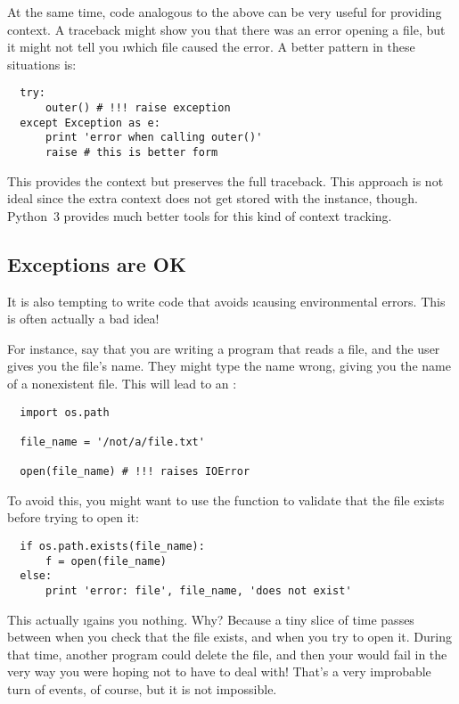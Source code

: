 \documentclass[letterpaper, 12pt, titlepage, twoside]{article}
\begin{document}
At the same time, code analogous to the above can be very useful for providing
context. A traceback might show you that there was an error opening a file,
but it might not tell you \i{which} file caused the error. A better pattern in
these situations is:

\begin{lstlisting}
  try:
      outer() # !!! raise exception
  except Exception as e:
      print 'error when calling outer()'
      raise # this is better form
\end{lstlisting}

This provides the context but preserves the full traceback. This approach is
not ideal since the extra context does not get stored with the 
instance, though. Python~3 provides much better tools for this kind of context
tracking.

\subsection*{Exceptions are OK}

It is also tempting to write code that avoids \i{causing} environmental
errors. This is often actually a bad idea!

For instance, say that you are writing a program that reads a file, and the
user gives you the file's name. They might type the name wrong, giving you the
name of a nonexistent file. This will lead to an :

\begin{lstlisting}
  import os.path

  file_name = '/not/a/file.txt'

  open(file_name) # !!! raises IOError
\end{lstlisting}

To avoid this, you might want to use the  function to
validate that the file exists before trying to open it:

\begin{lstlisting}
  if os.path.exists(file_name):
      f = open(file_name)
  else:
      print 'error: file', file_name, 'does not exist'
\end{lstlisting}

This actually \i{gains you nothing}. Why? Because a tiny slice of time passes
between when you check that the file exists, and when you try to open it.
During that time, another program could delete the file, and then your
 would fail in the very way you were hoping not to have to deal
with! That's a very improbable turn of events, of course, but it is not
impossible.
\end{document}
